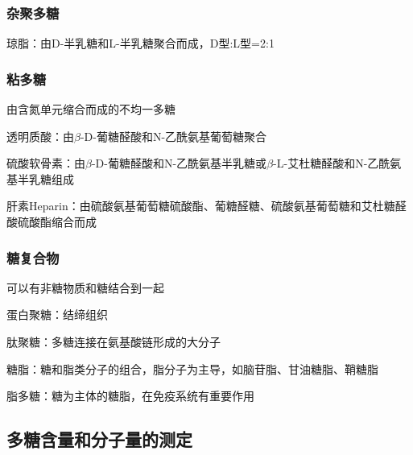 \subsubsection*{杂聚多糖}%
\label{subsub*:杂聚多糖}
\begin{eg}
    琼脂：由D-半乳糖和L-半乳糖聚合而成，D型:L型=2:1
\end{eg}
\subsubsection*{粘多糖}%
\label{subsub*:粘多糖}
由含氮单元缩合而成的不均一多糖
\begin{eg}
    透明质酸：由$\beta$-D-葡糖醛酸和N-乙酰氨基葡萄糖聚合
\end{eg}
\begin{eg}
    硫酸软骨素：由$\beta$-D-葡糖醛酸和N-乙酰氨基半乳糖或$\beta$-L-艾杜糖醛酸和N-乙酰氨基半乳糖组成
\end{eg}
\begin{eg}
    肝素Heparin：由硫酸氨基葡萄糖硫酸酯、葡糖醛糖、硫酸氨基葡萄糖和艾杜糖醛酸硫酸酯缩合而成
\end{eg}
\subsubsection*{糖复合物}%
\label{subsub*:糖复合物}
可以有非糖物质和糖结合到一起
\begin{notation}
    蛋白聚糖：结缔组织
\end{notation}
\begin{notation}
    肽聚糖：多糖连接在氨基酸链形成的大分子
\end{notation}
\begin{notation}
糖脂：糖和脂类分子的组合，脂分子为主导，如脑苷脂、甘油糖脂、鞘糖脂
\end{notation}
\begin{notation}
    脂多糖：糖为主体的糖脂，在免疫系统有重要作用
\end{notation}
\subsection{多糖含量和分子量的测定}%
\label{sub:多糖含量和分子量的测定}

